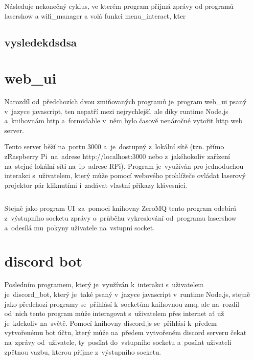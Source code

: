 Následuje nekonečný cyklus, ve kterém program příjmá zprávy od programů lasershow a wifi\_manager a volá funkci menu\_interact, kter

\subsection{vysledekdsdsa}

\section{web\_ui}

Narozdíl od~předchozích dvou zmiňovaných programů je~program web\_ui psaný v~jazyce javascript, ten nepatří mezi nejrychlejší, ale díky runtime Node.js a~knihovnám http a~formidable v~něm bylo časově nenáročné vytořit http web server.

Tento server běží na~portu 3000 a~je~dostupný z~lokální sítě (tzn. přímo z\~Raspberry Pi~na~adrese http://localhost:3000 nebo z~jakéhokoliv zařízení na~stejné lokální síti na~ip~adrese RPi).
Program je~využíván pro jednoduchou interakci s~uživatelem, který může pomocí webového prohlížeče ovládat laserový projektor pár kliknutími i~zadávat vlastní příkazy klávesnicí.


\inputminted{js}{code_examples/http_static_files.js}

Stejně jako program UI~za~pomoci knihovny ZeroMQ tento program odebírá z~výstupního socketu zprávy o~průběhu vykreslování od~programu lasershow a~odesílá mu~pokyny uživatele na~vstupní socket.



\section{discord bot}

Posledním programem, který je~využíván k~interakci s~uživatelem je~discord\_bot, který je~také psaný v~jazyce javascript v~runtime Node.js, stejně jako předchozí programy se~přihlásí k~socketům knihovnou zmq, ale na~rozdíl od~nich tento program může interagovat s~uživatelem přes internet ať už je~kdekoliv na~světě.
Pomocí knihovny discord.js se~přihlásí k~předem vytvořenému bot účtu, který může na~předem vytvořeném discord serveru čekat na~zprávy od~uživatele, ty~posílat do~vstupního socketu a~posílat uživateli zpětnou vazbu, kterou příjme z~výstupního socketu.

